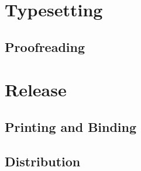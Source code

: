 \chapter{Typesetting}
\iffalse %
After finishing the design, the marked up manuscript can be flowed into the
document and checked for typesetting errors. Some of the more common typesetting
errors include \termpl{widow} and \termpl{orphan}---runt lines that are left
separated from the rest of the paragraph---, overfull lines, and improper line
breaks. In book design, only the actual errors found in the typeset document
need to be addressed. In web design, typographic errors need to be fixed
pre-emptively, as the document may display differently on various devices.
\fi
\section{Proofreading}

\chapter{Release}
\section{Printing and Binding}
\section{Distribution}
